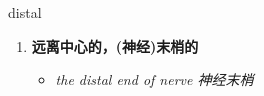 
\begin{frame}
{\huge distal}
\begin{center}
\begin{enumerate}\Large
  \item \textbf{远离中心的，(神经)末梢的}
  \begin{itemize}
    \item \em{\Large{the distal end of nerve 神经末梢}}
  \end{itemize}
\end{enumerate}
\end{center}
\end{frame}
